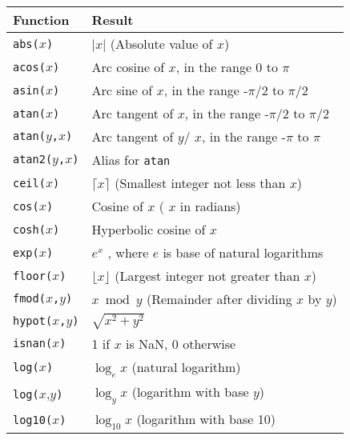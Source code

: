 \begin{tabular}{|l|l|}
    \hline 
      \textbf{Function} & 
      \textbf{Result}
    \\
      \hline 
      \hline 
        \texttt{abs(}$x$\texttt{)} & $|x|$ (Absolute value of $x$)
      \\
      \hline 
        \texttt{acos(}$x$\texttt{)} & Arc cosine of $x$, in the range 0 to $\pi$
      \\
      \hline 
        \texttt{asin(}$x$\texttt{)} & Arc sine of $x$, in the range -$\pi$/2 to $\pi$/2
      \\
      \hline 
        \texttt{atan(}$x$\texttt{)} & Arc tangent of $x$, in the range -$\pi$/2 to $\pi$/2
      \\
      \hline 
        \texttt{atan(}$y$\texttt{,}$x$\texttt{)} & Arc tangent of $y$/ $x$, in the range -$\pi$ to $\pi$
      \\
      \hline 
        \texttt{atan2(}$y$\texttt{,}$x$\texttt{)} & Alias for \texttt{atan}
      \\
      \hline 
        \texttt{ceil(}$x$\texttt{)} & $\lceil x\rceil$ (Smallest integer not less than $x$)
      \\
      \hline 
        \texttt{cos(}$x$\texttt{)} & Cosine of $x$ ( $x$ in radians)
      \\
      \hline 
        \texttt{cosh(}$x$\texttt{)} & Hyperbolic cosine of $x$
      \\
      \hline 
        \texttt{exp(}$x$\texttt{)} & $e^x$ , where $e$ is base of natural logarithms
      \\
      \hline 
        \texttt{floor(}$x$\texttt{)} & $\lfloor x\rfloor$ (Largest integer not greater than $x$)
      \\
      \hline 
        \texttt{fmod(}$x$\texttt{,}$y$\texttt{)} & $x \bmod y$ (Remainder after dividing $x$ by $y$)
      \\
      \hline 
        \texttt{hypot(}$x$\texttt{,}$y$\texttt{)} & $\sqrt{x^2+y^2}$
      \\
      \hline 
        \texttt{isnan(}$x$\texttt{)} & 1 if $x$ is NaN, 0 otherwise
      \\
      \hline 
        \texttt{log(}$x$\texttt{)} & $\log_e x$ (natural logarithm)
      \\
      \hline 
        \texttt{log(}$x$,$y$\texttt{)} & $\log_y x$ (logarithm with base $y$)
      \\
      \hline 
        \texttt{log10(}$x$\texttt{)} & $\log_{10} x$ (logarithm with base 10)
      \\

\end{tabular}
